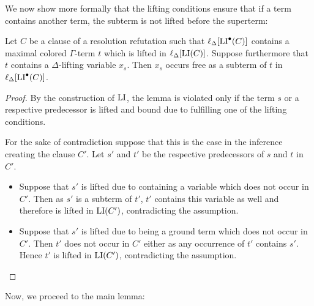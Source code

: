 We now show more formally that the lifting conditions ensure that if a term contains another term, the subterm is not lifted before the superterm:

\begin{lemma}
	\label{lemma:lifting_conditions}
	Let $C$ be a clause of a resolution refutation such that $\ell_{\Delta}[\operatorname{LI}^\bullet(C)]$ contains a maximal colored $\Gamma$-term $t$ which is lifted in $\ell_{\Delta}[\operatorname{LI}(C)]$.
	Suppose furthermore that $t$ contains a $\Delta$-lifting variable $x_s$.
	Then $x_s$ occurs free as a subterm of $t$ in $\ell_{\Delta}[\operatorname{LI}^\bullet(C)]$.
\end{lemma}
\begin{proof}
	By the construction of $\operatorname{LI}$, the lemma is violated only if the term $s$ or a respective predecessor is lifted and bound due to fulfilling one of the lifting conditions.

	For the sake of contradiction suppose that this is the case in the inference creating the clause $C'$.
	Let $s'$ and $t'$ be the respective predecessors of $s$ and $t$ in $C'$.

	\begin{itemize}
		\item Suppose that $s'$ is lifted due to containing a variable which does not occur in\nolinebreak{} $C'$.
			Then as $s'$ is a subterm of $t'$, $t'$ contains this variable as well and therefore is lifted in $\operatorname{LI}(C')$, contradicting the assumption.

		\item Suppose that $s'$ is lifted due to being a ground term which does not occur in\nolinebreak{} $C'$.
			Then $t'$ does not occur in $C'$ either as any occurrence of $t'$ contains $s'$. 
			Hence $t'$ is lifted in $\operatorname{LI}(C')$, contradicting the assumption.
			\qedhere
	\end{itemize}
\end{proof}

Now, we proceed to the main lemma:

